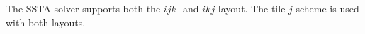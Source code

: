 \documentclass{sig-alternate-05-2015}
\begin{document}
The SSTA solver supports both the \(ijk\)- and \(ikj\)-layout.
The tile-\(j\) scheme is used with both layouts.

%
%
%
%
%
%
%
%
%
\end{document}
